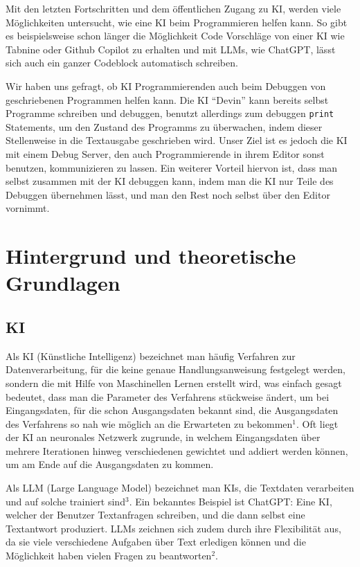 \documentclass[a4paper,12pt,ngerman]{scrartcl}
\begin{document}
Mit den letzten Fortschritten und dem öffentlichen Zugang zu KI, werden viele Möglichkeiten untersucht, wie eine KI beim Programmieren helfen kann. So gibt es beispielsweise schon länger die Möglichkeit Code Vorschläge von einer KI wie Tabnine oder Github Copilot zu erhalten und mit LLMs, wie ChatGPT, lässt sich auch ein ganzer Codeblock automatisch schreiben.

Wir haben uns gefragt, ob KI Programmierenden auch beim Debuggen von geschriebenen Programmen helfen kann. Die KI ``Devin'' kann bereits selbst Programme schreiben und debuggen, benutzt allerdings zum debuggen \texttt{print} Statements, um den Zustand des Programms zu überwachen, indem dieser Stellenweise in die Textausgabe geschrieben wird. Unser Ziel ist es jedoch die KI mit einem Debug Server, den auch Programmierende in ihrem Editor sonst benutzen, kommunizieren zu lassen. Ein weiterer Vorteil hiervon ist, dass man selbst zusammen mit der KI debuggen kann, indem man die KI nur Teile des Debuggen übernehmen lässt, und man den Rest noch selbst über den Editor vornimmt.

\section{Hintergrund und theoretische Grundlagen}

\subsection{KI}

Als KI (Künstliche Intelligenz) bezeichnet man häufig Verfahren zur Datenverarbeitung, für die keine genaue Handlungsanweisung festgelegt werden, sondern die mit Hilfe von Maschinellen Lernen erstellt wird, was einfach gesagt bedeutet, dass man die Parameter des Verfahrens stückweise ändert, um bei Eingangsdaten, für die schon Ausgangsdaten bekannt sind, die Ausgangsdaten des Verfahrens so nah wie möglich an die Erwarteten zu bekommen$^1$. Oft liegt der KI an neuronales Netzwerk zugrunde, in welchem Eingangsdaten über mehrere Iterationen hinweg verschiedenen gewichtet und addiert werden können, um am Ende auf die Ausgangsdaten zu kommen.

Als LLM (Large Language Model) bezeichnet man KIs, die Textdaten verarbeiten und auf solche trainiert sind$^3$. Ein bekanntes Beispiel ist ChatGPT: Eine KI, welcher der Benutzer Textanfragen schreiben, und die dann selbst eine Textantwort produziert. LLMs zeichnen sich zudem durch ihre Flexibilität aus, da sie viele verschiedene Aufgaben über Text erledigen können und die Möglichkeit haben vielen Fragen zu beantworten$^2$.
\end{document}
